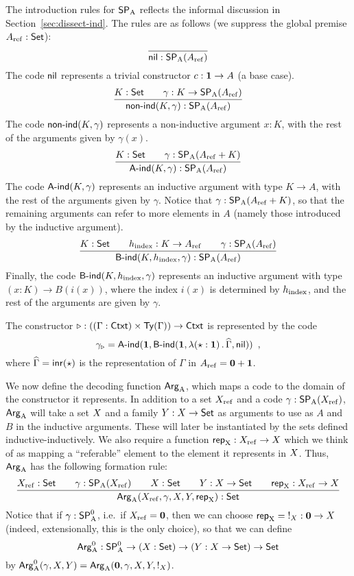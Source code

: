 \documentclass{schwicht}
\begin{document}
The introduction rules for $\mathsf{SP}_{\mathrm{A}}$ reflects the informal discussion in
Section~\ref{sec:dissect-ind}. The rules are as follows (we suppress
the global premise $A_{\mathrm{ref}} : \mathsf{Set}$):
\[
\infer{\nilA : \SPA(\Aref)}{}
\]
%
The code $\mathsf{nil}$ represents a trivial constructor $c : \mathbf{1} \to A$ (a base case).
%
\[
\infer{\nonindA(K, \gamma) : \SPA(\Aref)}{K : \Set & \quad \gamma : K \to \SPA(\Aref)}
\]
%
The code $\mathsf{non}\text{-}\mathsf{ind}(K, \gamma)$ represents a non-inductive argument $x
: K$, with the rest of the arguments given by $\gamma(x)$.
%
\[
\infer{\AindA(K, \gamma) : \SPA(\Aref)}{K : \Set & \quad \gamma : \SPA(\Aref + K)}
\]
%
The code $\mathsf{A}\text{-}\mathsf{ind}(K, \gamma)$ represents an inductive argument with
type $K \to A$, with the rest of the arguments given by
$\gamma$. Notice that $\gamma : \mathsf{SP}_{\mathrm{A}}(A_{\mathrm{ref}} + K)$, so that the
remaining arguments can refer to more elements in $A$ (namely those
introduced by the inductive argument).
%
\[
\infer{\BindA(K, \hindex, \gamma) : \SPA(\Aref)}{K : \Set & \quad \hindex : K \to \Aref & \quad \gamma : \SPA(\Aref)}
\]
%
Finally, the code $\mathsf{B}\text{-}\mathsf{ind}(K, h_{\mathrm{index}}, \gamma)$ represents an inductive
argument with type $(x : K) \to B(i(x))$, where the index $i(x)$ is
determined by $h_{\mathrm{index}}$, and the rest of the arguments are given by
$\gamma$.
%

\begin{example}
  The constructor $\triangleright : ((\Gamma : \mathsf{Ctxt}) \times \mathsf{Ty}(\Gamma))
  \to \mathsf{Ctxt}$ is represented by the code
\[
\gamma_{\triangleright} = \mathsf{A}\text{-}\mathsf{ind}(\mathbf{1}, \mathsf{B}\text{-}\mathsf{ind}(\mathbf{1}, \lambda (\star : \mathbf{1})\,.\,\widehat{\Gamma}, \mathsf{nil})) \enspace ,
\]
where $\widehat{\Gamma} = \mathsf{inr}(\star)$ is the representation of $\Gamma$ in $A_{\mathrm{ref}} = \mathbf{0} + \mathbf{1}$.
\blackqed
\end{example}

We now define the decoding function $\mathsf{Arg}_{\mathrm{A}}$, which maps a code to the
domain of the constructor it represents. In addition to a set $X_{\mathrm{ref}}$
and a code $\gamma : \mathsf{SP}_{\mathrm{A}}(X_{\mathrm{ref}})$, $\mathsf{Arg}_{\mathrm{A}}$ will take a set $X$ and a
family $Y : X \to \mathsf{Set}$ as arguments to use as $A$ and $B$ in the
inductive arguments. These will later be instantiated by the sets
defined inductive-inductively. We also require a function $\mathsf{rep}_{\mathrm{X}} :
X_{\mathrm{ref}} \to X$ which we think of as mapping a ``referable'' element to
the element it represents in $X$. Thus, $\mathsf{Arg}_{\mathrm{A}}$ has the
following formation rule:
%
\[
\infer{\ArgA(\Xref, \gamma, \A, \B, \repA) : \Set}{\Xref : \Set
                                         & \quad \gamma : \SPA(\Xref)
                                         & \quad \A : \Set
                                         & \quad \B : \A \to \Set
                                         & \quad \repA : \Xref \to \A}
\]
%
Notice that if $\gamma : \mathsf{SP}^{0}_{\mathrm{A}}$, i.e.\ if $X_{\mathrm{ref}} = \mathbf{0}$, then we can
choose $\mathsf{rep}_{\mathrm{X}} = {} !_{X} : \mathbf{0} \to X$ (indeed, extensionally,
this is the only choice), so that we can define
\[
\mathsf{Arg}^{0}_{\mathrm{A}} : \mathsf{SP}^{0}_{\mathrm{A}} \to (X : \mathsf{Set}) \to (Y : X \to \mathsf{Set}) \to \mathsf{Set}
\]
by $\mathsf{Arg}^{0}_{\mathrm{A}}(\gamma, X, Y) = \mathsf{Arg}_{\mathrm{A}}(\mathbf{0}, \gamma, X, Y, !_{X})$.
\end{document}
